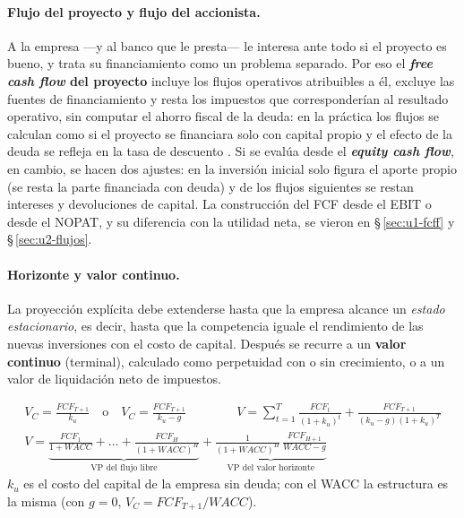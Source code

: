 \paragraph{Flujo del proyecto y flujo del accionista.} A la empresa —y al banco que le presta— le interesa ante todo si el proyecto es bueno, y trata su financiamiento como un problema separado. Por eso el \textbf{\emph{free cash flow} del proyecto} incluye los flujos operativos atribuibles a él, excluye las fuentes de financiamiento y resta los impuestos que corresponderían al resultado operativo, sin computar el ahorro fiscal de la deuda: en la práctica los flujos se calculan como si el proyecto se financiara solo con capital propio y el efecto de la deuda se refleja en la tasa de descuento . Si se evalúa desde el \textbf{\emph{equity cash flow}}, en cambio, se hacen dos ajustes: en la inversión inicial solo figura el aporte propio (se resta la parte financiada con deuda) y de los flujos siguientes se restan intereses y devoluciones de capital. La construcción del FCF desde el EBIT o desde el NOPAT, y su diferencia con la utilidad neta, se vieron en §\,\ref{sec:u1-fcff} y §\,\ref{sec:u2-flujos}.

\paragraph{Horizonte y valor continuo.} La proyección explícita debe extenderse hasta que la empresa alcance un \emph{estado estacionario}, es decir, hasta que la competencia iguale el rendimiento de las nuevas inversiones con el costo de capital. Después se recurre a un \textbf{valor continuo} (terminal), calculado como perpetuidad con o sin crecimiento, o a un valor de liquidación neto de impuestos.

\begin{formulaBox}
\[
\begin{gathered}
V_C = \frac{FCF_{T+1}}{k_u}\quad\text{o}\quad V_C = \frac{FCF_{T+1}}{k_u - g}
\qquad\qquad
V = \sum_{t=1}^{T}\frac{FCF_t}{(1+k_u)^{t}} + \frac{FCF_{T+1}}{(k_u-g)(1+k_u)^{T}}
\\[4pt]
V = \underbrace{\frac{FCF_1}{1+WACC} + \dots + \frac{FCF_H}{(1+WACC)^{H}}}_{\text{VP del flujo libre}}
  + \underbrace{\frac{1}{(1+WACC)^{H}}\,\frac{FCF_{H+1}}{WACC-g}}_{\text{VP del valor horizonte}}
\end{gathered}
\]
$k_u$ es el costo del capital de la empresa sin deuda; con el WACC  la estructura es la misma (con $g = 0$, $V_C = FCF_{T+1}/WACC$).
\end{formulaBox}

